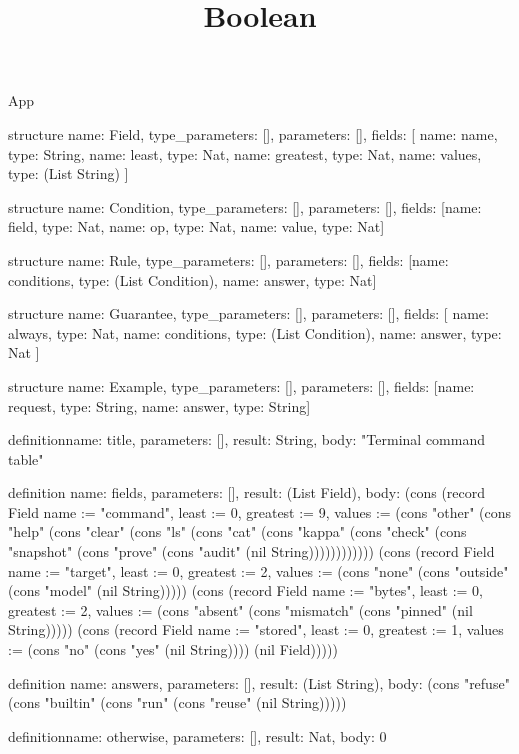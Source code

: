 \begin{lexlean}{App}
\title{Boolean}
\begin{semanticmodule}
structure{
  name: Field,
  type_parameters: [],
  parameters: [],
  fields: [
    {name: name, type: String},
    {name: least, type: Nat},
    {name: greatest, type: Nat},
    {name: values, type: (List String)}
  ]
}

structure{
  name: Condition,
  type_parameters: [],
  parameters: [],
  fields: [{name: field, type: Nat}, {name: op, type: Nat}, {name: value, type: Nat}]
}

structure{
  name: Rule,
  type_parameters: [],
  parameters: [],
  fields: [{name: conditions, type: (List Condition)}, {name: answer, type: Nat}]
}

structure{
  name: Guarantee,
  type_parameters: [],
  parameters: [],
  fields: [
    {name: always, type: Nat},
    {name: conditions, type: (List Condition)},
    {name: answer, type: Nat}
  ]
}

structure{
  name: Example,
  type_parameters: [],
  parameters: [],
  fields: [{name: request, type: String}, {name: answer, type: String}]
}

definition{name: title, parameters: [], result: String, body: "Terminal command table"}

definition{
  name: fields,
  parameters: [],
  result: (List Field),
  body: (cons (record Field {name := "command", least := 0, greatest := 9, values := (cons "other" (cons "help" (cons "clear" (cons "ls" (cons "cat" (cons "kappa" (cons "check" (cons "snapshot" (cons "prove" (cons "audit" (nil String)))))))))))}) (cons (record Field {name := "target", least := 0, greatest := 2, values := (cons "none" (cons "outside" (cons "model" (nil String))))}) (cons (record Field {name := "bytes", least := 0, greatest := 2, values := (cons "absent" (cons "mismatch" (cons "pinned" (nil String))))}) (cons (record Field {name := "stored", least := 0, greatest := 1, values := (cons "no" (cons "yes" (nil String)))}) (nil Field)))))
}

definition{
  name: answers,
  parameters: [],
  result: (List String),
  body: (cons "refuse" (cons "builtin" (cons "run" (cons "reuse" (nil String)))))
}

definition{name: otherwise, parameters: [], result: Nat, body: 0}


\end{semanticmodule}
\end{lexlean}
